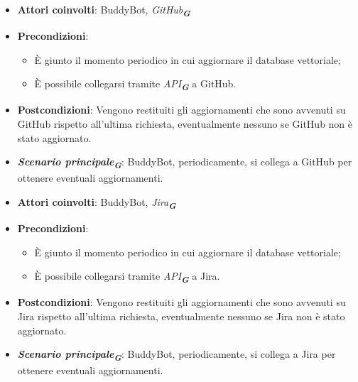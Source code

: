 
\begin{itemize}
    \item \textbf{Attori coinvolti}: BuddyBot, \emph{GitHub}\textsubscript{\textbf{\textit{G}}}
    \item \textbf{Precondizioni}: 
    \begin{itemize}
        \item È giunto il momento periodico in cui aggiornare il database vettoriale;
        \item È possibile collegarsi tramite \emph{API}\textsubscript{\textbf{\textit{G}}} a GitHub.
    \end{itemize}
    \item \textbf{Postcondizioni}: Vengono restituiti gli aggiornamenti che sono avvenuti su GitHub rispetto all'ultima richiesta, eventualmente nessuno 
    se GitHub non è stato aggiornato.
    \item \textbf{\emph{Scenario principale}\textsubscript{\textbf{\textit{G}}}}: BuddyBot, periodicamente, si collega a GitHub per ottenere eventuali aggiornamenti.
\end{itemize}




\begin{itemize}
    \item \textbf{Attori coinvolti}: BuddyBot, \emph{Jira}\textsubscript{\textbf{\textit{G}}}
    \item \textbf{Precondizioni}:
    \begin{itemize}
        \item È giunto il momento periodico in cui aggiornare il database vettoriale;
        \item È possibile collegarsi tramite \emph{API}\textsubscript{\textbf{\textit{G}}} a Jira.
    \end{itemize}
    \item \textbf{Postcondizioni}: Vengono restituiti gli aggiornamenti che sono avvenuti su Jira rispetto all'ultima richiesta, eventualmente nessuno 
    se Jira non è stato aggiornato.
    \item \textbf{\emph{Scenario principale}\textsubscript{\textbf{\textit{G}}}}: BuddyBot, periodicamente, si collega a Jira per ottenere eventuali aggiornamenti.
\end{itemize}




